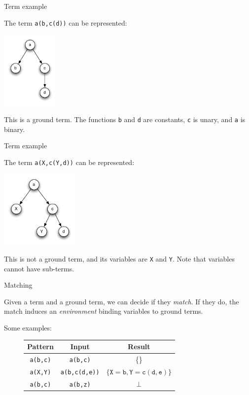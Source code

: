 \documentclass{beamer}
\begin{document}
\begin{frame}{Term example}

The term \texttt{a(b,c(d))} can be represented:

\begin{center}
\includegraphics[height=1.5in]{images/example-term-1}
\end{center}

This is a ground term. The functions \texttt{b} and \texttt{d} are constants,
\texttt{c} is unary, and \texttt{a} is binary.

\end{frame}


\begin{frame}{Term example}

The term \texttt{a(X,c(Y,d))} can be represented:

\begin{center}
\includegraphics[height=1.5in]{images/example-term-2}
\end{center}

This is not a ground term, and its variables are \texttt{X} and \texttt{Y}.
Note that variables cannot have sub-terms.

\end{frame}


\begin{frame}[fragile]{Matching}

Given a term and a ground term, we can decide if they \emph{match}. If they
do, the match induces an \emph{environment} binding variables to ground terms.

Some examples:

\begin{figure}[h]
\begin{tabular}{|c|c|c|}
\hline
\textbf{Pattern} & \textbf{Input} & \textbf{Result}\\
\hline
\texttt{a(b,c)} & \texttt{a(b,c)} & \{\}\\
\hline
\texttt{a(X,Y)} & \texttt{a(b,c(d,e))} &
  $\{\mathtt{X}=\mathtt{b},\mathtt{Y}=\mathtt{c(d,e)}\}$\\
\hline
\texttt{a(b,c)} & \texttt{a(b,z)} & $\bot$\\
\hline
\end{tabular}
\end{figure}

\end{frame}
\end{document}
